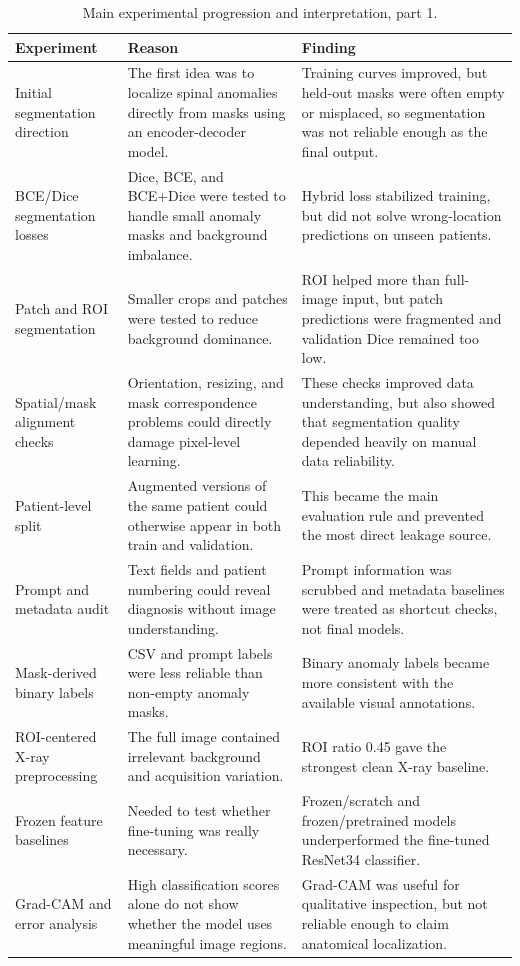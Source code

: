\begin{table}[H]
    \centering
    \small
    \caption{Main experimental progression and interpretation, part 1.}
    \label{tab:experiment_progression_a}
    \begin{tabularx}{\textwidth}{p{}|X|X}
        \hline
        \textbf{Experiment} & \textbf{Reason} & \textbf{Finding} \\
        \hline
        Initial segmentation direction & The first idea was to localize spinal anomalies directly from masks using an encoder-decoder model. & Training curves improved, but held-out masks were often empty or misplaced, so segmentation was not reliable enough as the final output. \\
        BCE/Dice segmentation losses & Dice, BCE, and BCE+Dice were tested to handle small anomaly masks and background imbalance. & Hybrid loss stabilized training, but did not solve wrong-location predictions on unseen patients. \\
        Patch and ROI segmentation & Smaller crops and patches were tested to reduce background dominance. & ROI helped more than full-image input, but patch predictions were fragmented and validation Dice remained too low. \\
        Spatial/mask alignment checks & Orientation, resizing, and mask correspondence problems could directly damage pixel-level learning. & These checks improved data understanding, but also showed that segmentation quality depended heavily on manual data reliability. \\
        Patient-level split & Augmented versions of the same patient could otherwise appear in both train and validation. & This became the main evaluation rule and prevented the most direct leakage source. \\
        Prompt and metadata audit & Text fields and patient numbering could reveal diagnosis without image understanding. & Prompt information was scrubbed and metadata baselines were treated as shortcut checks, not final models. \\
        Mask-derived binary labels & CSV and prompt labels were less reliable than non-empty anomaly masks. & Binary anomaly labels became more consistent with the available visual annotations. \\
        ROI-centered X-ray preprocessing & The full image contained irrelevant background and acquisition variation. & ROI ratio 0.45 gave the strongest clean X-ray baseline. \\
        Frozen feature baselines & Needed to test whether fine-tuning was really necessary. & Frozen/scratch and frozen/pretrained models underperformed the fine-tuned ResNet34 classifier. \\
        Grad-CAM and error analysis & High classification scores alone do not show whether the model uses meaningful image regions. & Grad-CAM was useful for qualitative inspection, but not reliable enough to claim anatomical localization. \\
        \hline
    \end{tabularx}
\end{table}

